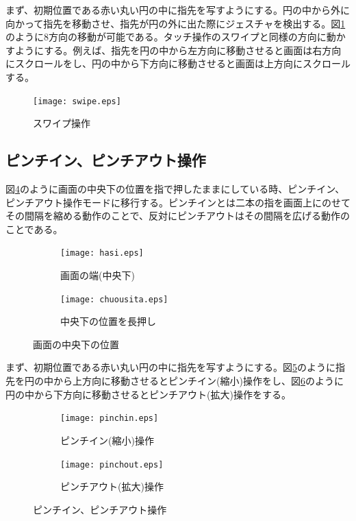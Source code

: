 \documentclass[11pt,a4j, titlepage]{jarticle} %
\begin{document}
まず、初期位置である赤い丸い円の中に指先を写すようにする。円の中から外に向かって指先を移動させ、指先が円の外に出た際にジェスチャを検出する。図\ref{fig:f8}のように8方向の移動が可能である。タッチ操作のスワイプと同様の方向に動かすようにする。例えば、指先を円の中から左方向に移動させると画面は右方向にスクロールをし、円の中から下方向に移動させると画面は上方向にスクロールする。

\begin{figure}[H]
	\centering
	\texttt{[image: swipe.eps]}
	\caption{スワイプ操作}
	\label{fig:f8}
\end{figure}

\subsection{ピンチイン、ピンチアウト操作}
図\ref{fig:f9}のように画面の中央下の位置を指で押したままにしている時、ピンチイン、ピンチアウト操作モードに移行する。ピンチインとは二本の指を画面上にのせてその間隔を縮める動作のことで、反対にピンチアウトはその間隔を広げる動作のことである。

\begin{figure}[H]
	\centering
	\begin{subfigure}{0.4\columnwidth}
		\centering
		\texttt{[image: hasi.eps]}
		\caption{画面の端(中央下)}
		\label{fig:hasi2}
	\end{subfigure}
	\begin{subfigure}{0.4\columnwidth}
		\centering
		\texttt{[image: chuousita.eps]}
		\caption{中央下の位置を長押し}
		\label{fig:chuousita}
	\end{subfigure}
	\caption{画面の中央下の位置}
	\label{fig:f9}
\end{figure}

まず、初期位置である赤い丸い円の中に指先を写すようにする。図\ref{fig:pinchin}のように指先を円の中から上方向に移動させるとピンチイン(縮小)操作をし、図\ref{fig:pinchout}のように円の中から下方向に移動させるとピンチアウト(拡大)操作をする。

\begin{figure}[H]
	\centering
	\begin{subfigure}{0.4\columnwidth}
		\centering
		\texttt{[image: pinchin.eps]}
		\caption{ピンチイン(縮小)操作}
		\label{fig:pinchin}
	\end{subfigure}
	\begin{subfigure}{0.4\columnwidth}
		\centering
		\texttt{[image: pinchout.eps]}
		\caption{ピンチアウト(拡大)操作}
		\label{fig:pinchout}
	\end{subfigure}
	\caption{ピンチイン、ピンチアウト操作}
	\label{fig:f10}
\end{figure}
\end{document}
